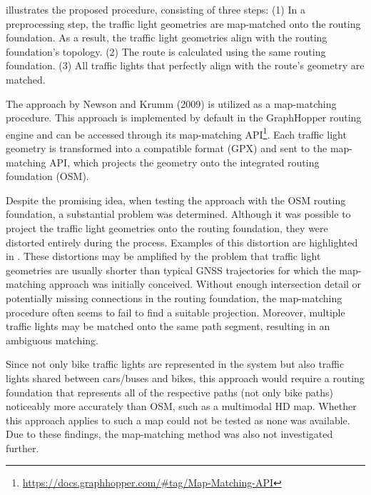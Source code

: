  illustrates the proposed procedure, consisting of three steps: (1) In a preprocessing step, the traffic light geometries are map-matched onto the routing foundation. As a result, the traffic light geometries align with the routing foundation's topology. (2) The route is calculated using the same routing foundation. (3) All traffic lights that perfectly align with the route's geometry are matched.

The approach by Newson and Krumm (2009) \cite{newson_hidden_2009} is utilized as a map-matching procedure. This approach is implemented by default in the GraphHopper routing engine and can be accessed through its map-matching API\footnote{\url{https://docs.graphhopper.com/\#tag/Map-Matching-API}}. Each traffic light geometry is transformed into a compatible format (GPX) and sent to the map-matching API, which projects the geometry onto the integrated routing foundation (OSM).

Despite the promising idea, when testing the approach with the OSM routing foundation, a substantial problem was determined. Although it was possible to project the traffic light geometries onto the routing foundation, they were distorted entirely during the process. Examples of this distortion are highlighted in . These distortions may be amplified by the problem that traffic light geometries are usually shorter than typical GNSS trajectories for which the map-matching approach was initially conceived. Without enough intersection detail or potentially missing connections in the routing foundation, the map-matching procedure often seems to fail to find a suitable projection. Moreover, multiple traffic lights may be matched onto the same path segment, resulting in an ambiguous matching. 

Since not only bike traffic lights are represented in the system but also traffic lights shared between cars/buses and bikes, this approach would require a routing foundation that represents all of the respective paths (not only bike paths) noticeably more accurately than OSM, such as a multimodal HD map. Whether this approach applies to such a map could not be tested as none was available. Due to these findings, the map-matching method was also not investigated further.

